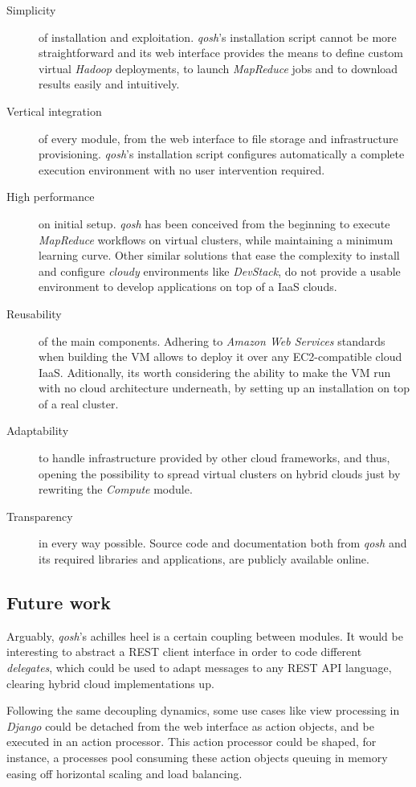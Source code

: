 \documentclass{sig-alternate}
\begin{document}
\begin{description}
 \item[Simplicity] of installation and exploitation. \emph{qosh}'s installation script cannot be more straightforward and its web interface provides the means to define custom virtual \emph{Hadoop} deployments, to launch \emph{MapReduce} jobs and to download results easily and intuitively.
 \item[Vertical integration] of every module, from the web interface to file storage and infrastructure provisioning. \emph{qosh}'s installation script configures automatically a complete execution environment with no user intervention required.
 \item[High performance] on initial setup. \emph{qosh} has been conceived from the beginning to execute \emph{MapReduce} workflows on virtual clusters, while maintaining a minimum learning curve. Other similar solutions that ease the complexity to install and configure \emph{cloudy} environments like \emph{DevStack}, do not provide a usable environment to develop applications on top of a IaaS clouds.
 \item[Reusability] of the main components. Adhering to \emph{Amazon Web Services} standards when building the VM \cite{ahvm:2013:online} allows to deploy it over any EC2-compatible cloud IaaS. Aditionally, its worth considering the ability to make the VM run with no cloud architecture underneath, by setting up an installation on top of a real cluster.
 \item[Adaptability] to handle infrastructure provided by other cloud frameworks, and thus, opening the possibility to spread virtual clusters on hybrid clouds just by rewriting the \emph{Compute} module.
 \item[Transparency] in every way possible. Source code and documentation both from \emph{qosh} and its required libraries and applications, are publicly available online.
\end{description}

\subsection{Future work}
\noindent Arguably, \emph{qosh}'s achilles heel is a certain coupling between modules. It would be interesting to abstract a REST client interface in order to code different \emph{delegates}, which could be used to adapt messages to any REST API language, clearing hybrid cloud implementations up.

Following the same decoupling dynamics, some use cases like view processing in \emph{Django} could be detached from the web interface as action objects, and be executed in an action processor. This action processor could be shaped, for instance, a processes pool consuming these action objects queuing in memory easing off horizontal scaling and load balancing.
\end{document}

